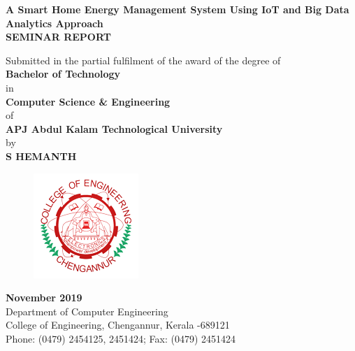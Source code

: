 \documentclass[a4paper,12pt,oneside]{article}
\begin{document}
\thispagestyle{empty}
\begin{center}

\large{\textbf{{A Smart Home Energy Management System
Using IoT and Big Data Analytics Approach}}}
\setlength{\baselineskip}{1.5\baselineskip}
\\
\vspace{5mm}
\textbf{SEMINAR REPORT}

Submitted in the partial fulfilment of the award of the degree
of
\\
\textbf{Bachelor of Technology}
\\
in
\\
\textbf{Computer Science \& Engineering}
\\
of
\\
\textbf{APJ Abdul Kalam Technological University}
\\
by
\\
\textbf{S HEMANTH}
\\
\vspace{5mm}
\begin{figure}[H]
\centering
\includegraphics{ceclogo.png}
\end{figure}
\textbf{November 2019}
\vspace{8mm}
\\
Department of Computer Engineering
\\
College of Engineering, Chengannur, Kerala -689121
\\
Phone: (0479) 2454125, 2451424; Fax: (0479) 2451424
\\
\end{center}
\end{document}
